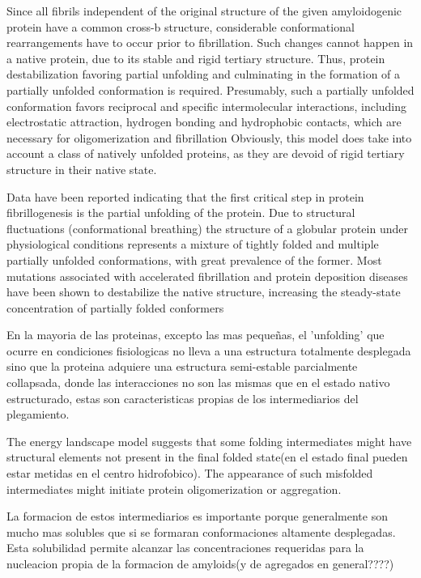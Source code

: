 Since all fibrils independent of the original structure of the given amyloidogenic protein have a common cross-b structure, considerable conformational rearrangements have to occur prior to fibrillation. 
Such changes cannot happen in a native protein, due to its stable and rigid tertiary structure. Thus, protein destabilization favoring partial unfolding and culminating in the formation of a partially unfolded conformation is required. 
Presumably, such a partially unfolded conformation favors reciprocal and specific intermolecular interactions, including electrostatic attraction, hydrogen bonding and hydrophobic contacts, which are necessary for oligomerization and fibrillation
Obviously, this model does take into account a class of natively unfolded proteins, as they are devoid of rigid tertiary structure in their native state.

Data have been reported indicating that the first critical step in protein fibrillogenesis is the partial unfolding of the protein. 
Due to structural fluctuations (conformational breathing) the structure of a globular protein under physiological conditions represents a mixture of tightly folded and multiple partially unfolded conformations, 
with great prevalence of the former. 
Most mutations associated with accelerated fibrillation and protein deposition diseases have been shown to destabilize the native structure, increasing the steady-state concentration of partially folded conformers

En la mayoria de las proteinas, excepto las mas pequeñas, el 'unfolding' que ocurre en condiciones fisiologicas no lleva a una estructura totalmente desplegada sino que la proteina adquiere una estructura semi-estable parcialmente collapsada,
donde las interacciones no son las mismas que en el estado nativo estructurado, estas son caracteristicas propias de los intermediarios del plegamiento.

The energy landscape model suggests that some folding intermediates might have structural elements not present in the final folded state(en el estado final pueden estar metidas en el centro hidrofobico).
The appearance of such misfolded intermediates might initiate protein oligomerization or aggregation.

La formacion de estos intermediarios es importante porque generalmente son mucho mas solubles que si se formaran conformaciones altamente desplegadas. 
Esta solubilidad permite alcanzar las concentraciones requeridas para la nucleacion propia de la formacion de amyloids(y de agregados en general????)

